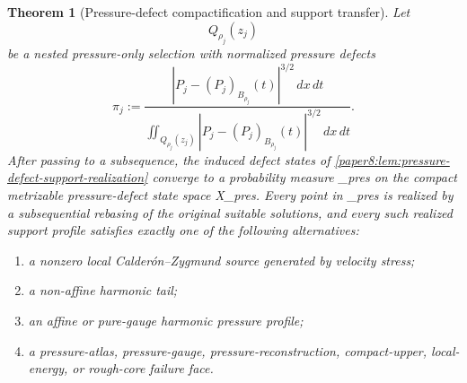 \documentclass[11pt]{amsart}
\def\({}%
\def\){}%
\def\mathfrak#1{#1}%
\theoremstyle{plain}
\newtheorem{theorem}{Theorem}[section]
\theoremstyle{definition}
\theoremstyle{remark}
\begin{document}
\begin{theorem}[Pressure-defect compactification and support transfer]
\label{paper8:thm:pressure-defect-compactification-support-transfer}
Let
\[
  Q_{\rho_j}(z_j)
\]
be a nested pressure-only selection with normalized pressure defects
\[
  \pi_j
  :=
  \frac{|P_j-(P_j)_{B_{\rho_j}}(t)|^{3/2}\,dx\,dt}
  {\iint_{Q_{\rho_j}(z_j)}
  |P_j-(P_j)_{B_{\rho_j}}(t)|^{3/2}\,dx\,dt}.
\]
After passing to a subsequence, the induced defect states of
\cref{paper8:lem:pressure-defect-support-realization} converge to a probability
measure \(\Pi_{\rm pres}\) on the compact metrizable pressure-defect state
space \(\mathfrak X_{\rm pres}\).  Every point in
\(\Pi_{\rm pres}\) is realized by a subsequential rebasing of
the original suitable solutions, and every such realized support profile
satisfies exactly one of the following alternatives:
\begin{enumerate}[label=\textup{(\roman*)}]
\item a nonzero local Calder\'on--Zygmund source generated by velocity stress;
\item a non-affine harmonic tail;
\item an affine or pure-gauge harmonic pressure profile;
\item a pressure-atlas, pressure-gauge, pressure-reconstruction,
compact-upper, local-energy, or rough-core failure face.
\end{enumerate}
\end{theorem}
\end{document}
